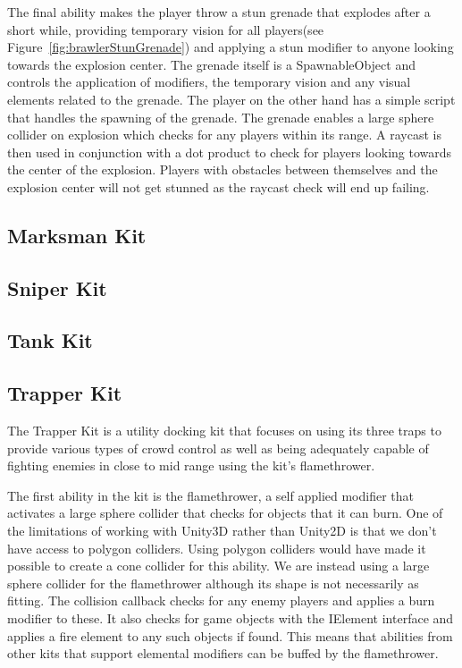 The final ability makes the player throw a stun grenade that explodes after a short while, providing temporary vision for all players(see Figure~\ref{fig:brawlerStunGrenade}) and applying a stun modifier to anyone looking towards the explosion center. The grenade itself is a SpawnableObject and controls the application of modifiers, the temporary vision and any visual elements related to the grenade. The player on the other hand has a simple script that handles the spawning of the grenade. The grenade enables a large sphere collider on explosion which checks for any players within its range. A raycast is then used in conjunction with a dot product to check for players looking towards the center of the explosion. Players with obstacles between themselves and the explosion center will not get stunned as the raycast check will end up failing. 

\subsection{Marksman Kit}
\subsection{Sniper Kit}
\subsection{Tank Kit}

\subsection{Trapper Kit}
The Trapper Kit is a utility docking kit that focuses on using its three traps to provide various types of crowd control as well as being adequately capable of fighting enemies in close to mid range using the kit's flamethrower.  

The first ability in the kit is the flamethrower, a self applied modifier that activates a large sphere collider that checks for objects that it can burn. One of the limitations of working with Unity3D rather than Unity2D is that we don't have access to polygon colliders. Using polygon colliders would have made it possible to create a cone collider for this ability. We are instead using a large sphere collider for the flamethrower although its shape is not necessarily as fitting.
The collision callback checks for any enemy players and applies a burn modifier to these. It also checks for game objects with the IElement interface and applies a fire element to any such objects if found. This means that abilities from other kits that support elemental modifiers can be buffed by the flamethrower.

